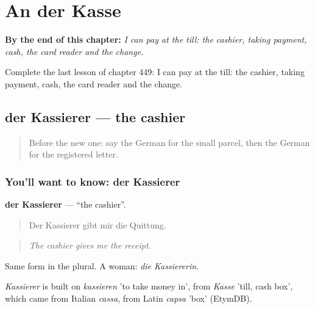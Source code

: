 
\chapter{An der Kasse}
\label{ch:ge-an-der-kasse}

\begin{chapteropening}
\textbf{By the end of this chapter:} \emph{I can pay at the till: the cashier, taking payment, cash, the card reader and the change.}

Complete the last lesson of chapter 449: I can pay at the till: the cashier, taking payment, cash, the card reader and the change.
\end{chapteropening}

\section[der Kassierer]{der Kassierer — the cashier}

\label{lesson:GE-C449-kassierer}



\begin{quote}
Before the new one: say the German for the small parcel, then the German for the registered letter.
\end{quote}

\subsection*{You'll want to know: der Kassierer}
\textbf{der Kassierer} — \textquotedblleft{}the cashier\textquotedblright{}.

\begin{quote}
Der Kassierer gibt mir die Quittung.
\end{quote}

\begin{quote}
\emph{The cashier gives me the receipt.}
\end{quote}

Same form in the plural. A woman: \emph{die Kassiererin}.

\begin{cousinweb}
\emph{Kassierer} is built on \emph{kassieren} 'to take money in', from \emph{Kasse} 'till, cash box', which came from Italian \emph{cassa}, from Latin \emph{capsa} 'box' (EtymDB).
\end{cousinweb}

